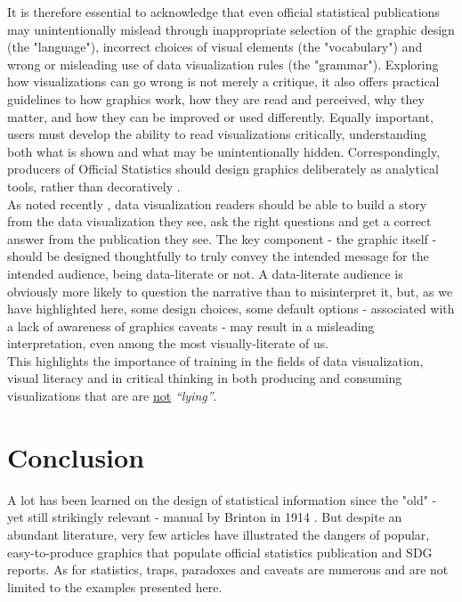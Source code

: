 \documentclass[11pt,twoside,a4paper]{article}
\begin{document}
It is therefore essential to acknowledge that even official statistical publications may unintentionally mislead through inappropriate selection of the graphic design (the "language"), incorrect choices of visual elements (the "vocabulary")  and  wrong or misleading use of data visualization rules (the "grammar"). Exploring how visualizations can go wrong is not merely a critique, it also offers practical guidelines to how graphics work, how they are read and perceived, why they matter, and how they can be improved or used differently.
Equally important, users must develop the ability to read visualizations critically, understanding both what is shown and what may be unintentionally hidden. Correspondingly, producers of Official Statistics should design graphics deliberately as analytical tools, rather than decoratively \citep{Tufte2006}.\\

As noted recently \citep{sabbati2022Literacy}, data visualization readers should be able to build a story from the data visualization they see, ask the right questions and get a correct answer from the publication they see. The key component - the graphic itself - should be designed thoughtfully to truly convey the intended message for the intended audience,  being data-literate or not. A data-literate audience is obviously more likely to question the narrative than to misinterpret it, but, as we have highlighted here, some design choices, some default options - associated with a lack of awareness of graphics caveats - may result in a misleading interpretation, even among the most visually-literate of us. \\

This highlights  the importance of training in the fields of data visualization, visual literacy and in critical thinking in both producing and consuming visualizations that are are \underline{not} \textit{``lying''}.

\section{ Conclusion}

A lot has been learned on the design of statistical information since the "old" - yet still strikingly relevant -  manual by Brinton in 1914 \citep{Brinton1914}. But despite an abundant literature, very few articles have illustrated the dangers of popular, easy-to-produce graphics that populate official statistics publication and SDG reports. As for statistics, traps, paradoxes and caveats are numerous and are not limited to the  examples presented here.\\
\end{document}
